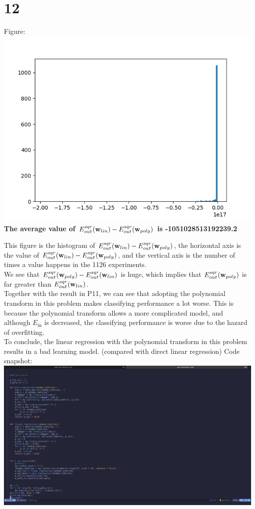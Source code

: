 \documentclass[11pt]{article}
\theoremstyle{definition}
\begin{document}
\section*{12}
Figure: \\ 
\includegraphics[width = \textwidth]{P12.png} \\
\textbf{The average value of $E^{sqr}_{out}(\vb{w}_{lin}) - E^{sqr}_{out}(\vb{w}_{poly})$ is -1051028513192239.2} \\ 
\par
This figure is the histogram of $E^{sqr}_{out}(\vb{w}_{lin}) - E^{sqr}_{out}(\vb{w}_{poly})$, the horizontal axis is the value of $E^{sqr}_{out}(\vb{w}_{lin}) - E^{sqr}_{out}(\vb{w}_{poly})$, and the vertical axis is the number of times a value happens in the 1126 experiments. \\
We see that $E^{sqr}_{out}(\vb{w}_{poly}) - E^{sqr}_{out}(\vb{w}_{lin})$ is huge, which implies that $E^{sqr}_{out}(\vb{w}_{poly})$ is far greater than $E^{sqr}_{out}(\vb{w}_{lin})$. \\ 
Together with the result in P11, we can see that adopting the polynomial transform in this problem makes classifying performance a lot worse. This is because the polynomial transform allows a more complicated model, and although $E_\text{in}$ is decreased, the classifying performance is worse due to the hazard of overfitting. \\ 
To conclude, the linear regression with the polynomial transform in this problem results in a bad learning model. (compared with direct linear regression)
\newpage
Code snapshot: \\ 
\includegraphics[width = \textwidth]{P12snap.png}
\newpage
\end{document}
